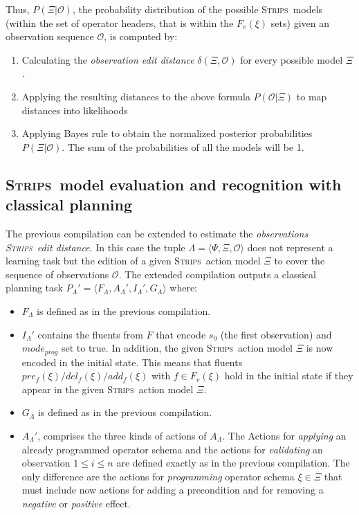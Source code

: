 \documentclass{article}
\newcommand{\tup}[1]{{\langle #1 \rangle}}
\newcommand{\strips}{\textsc{Strips}}     %
\begin{document}
Thus, $P(\Xi|\mathcal{O})$, the probability distribution of the possible \strips\ models (within the set of operator headers, that is within the $F_v(\xi)$ sets) given an observation sequence $\mathcal{O}$, is computed by:

\begin{enumerate}
\item Calculating the {\em observation edit distance} $\delta(\Xi,\mathcal{O})$ for every possible model $\Xi$.
\item Applying the resulting distances to the above formula $P(\mathcal{O}|\Xi)$ to map distances into likelihoods
\item Applying Bayes rule to obtain the normalized posterior probabilities $P(\Xi|\mathcal{O})$. The sum of the probabilities of all the models will be 1.
\end{enumerate}



\subsection{\strips\ model evaluation and recognition with classical planning}
The previous compilation can be extended to estimate the {\em observations  \strips\ edit distance}. In this case the tuple $\Lambda=\tup{\Psi,\Xi,\mathcal{O}}$ does not represent a learning task but the edition of a given \strips\ action model $\Xi$ to cover the sequence of observations $\mathcal{O}$. The extended compilation outputs a classical planning task $P_{\Lambda}'=\tup{F_{\Lambda},A_{\Lambda}',I_{\Lambda}',G_{\Lambda}}$ where:
\begin{itemize}
\item $F_{\Lambda}$ is defined as in the previous compilation.
\item $I_{\Lambda}'$ contains the fluents from $F$ that encode $s_0$ (the first observation) and $mode_{prog}$ set to true. In addition, the given \strips\ action model $\Xi$ is now encoded in the initial state. This means that fluents $pre_f(\xi)/del_f(\xi)/add_f(\xi)$ with $f\in F_v(\xi)$ hold in the initial state if they appear in the given \strips\ action model $\Xi$.
\item $G_{\Lambda}$ is defined as in the previous compilation.
\item $A_{\Lambda}'$, comprises the three kinds of actions of $A_{\Lambda}$. The Actions for {\em applying} an already programmed operator schema and the actions for {\em validating} an observation {\tt\small $1\leq i\leq n$} are defined exactly as in the previous compilation. The only difference are the actions for {\em programming} operator schema $\xi\in\Xi$ that must include now actions for adding a precondition and for removing a {\em negative} or {\em positive} effect.
\end{itemize}
\end{document}
